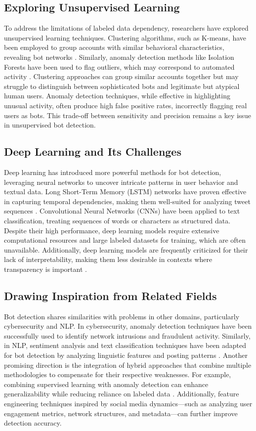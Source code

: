 \documentclass[10pt,twocolumn]{article}
\begin{document}
\subsection{Exploring Unsupervised Learning}
To address the limitations of labeled data dependency, researchers have explored unsupervised learning techniques. Clustering algorithms, such as K-means, have been employed to group accounts with similar behavioral characteristics, revealing bot networks \cite{Hajli2021}. Similarly, anomaly detection methods like Isolation Forests have been used to flag outliers, which may correspond to automated activity \cite{Grimme2018}. Clustering approaches can group similar accounts together but may struggle to distinguish between sophisticated bots and legitimate but atypical human users. Anomaly detection techniques, while effective in highlighting unusual activity, often produce high false positive rates, incorrectly flagging real users as bots. This trade-off between sensitivity and precision remains a key issue in unsupervised bot detection.

\subsection{Deep Learning and Its Challenges}
Deep learning has introduced more powerful methods for bot detection, leveraging neural networks to uncover intricate patterns in user behavior and textual data. Long Short-Term Memory (LSTM) networks have proven effective in capturing temporal dependencies, making them well-suited for analyzing tweet sequences \cite{Kenny2022}. Convolutional Neural Networks (CNNs) have been applied to text classification, treating sequences of words or characters as structured data. Despite their high performance, deep learning models require extensive computational resources and large labeled datasets for training, which are often unavailable. Additionally, deep learning models are frequently criticized for their lack of interpretability, making them less desirable in contexts where transparency is important \cite{Adams2017}. 

\subsection{Drawing Inspiration from Related Fields}
Bot detection shares similarities with problems in other domains, particularly cybersecurity and NLP. In cybersecurity, anomaly detection techniques have been successfully used to identify network intrusions and fraudulent activity. Similarly, in NLP, sentiment analysis and text classification techniques have been adapted for bot detection by analyzing linguistic features and posting patterns \cite{Hajli2021}. Another promising direction is the integration of hybrid approaches that combine multiple methodologies to compensate for their respective weaknesses. For example, combining supervised learning with anomaly detection can enhance generalizability while reducing reliance on labeled data \cite{Hayawi2023}. Additionally, feature engineering techniques inspired by social media dynamics—such as analyzing user engagement metrics, network structures, and metadata—can further improve detection accuracy.
\end{document}

